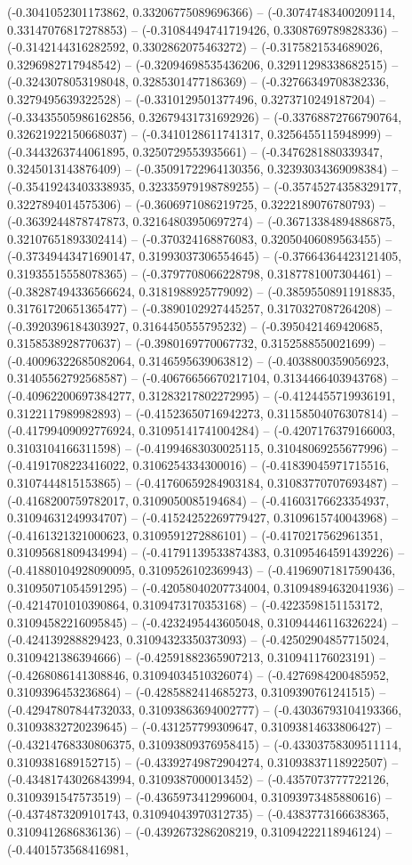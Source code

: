 (-0.3041052301173862, 0.33206775089696366) -- (-0.30747483400209114, 0.33147076817278853) -- (-0.31084494741719426, 0.3308769789828336) -- (-0.3142144316282592, 0.3302862075463272) -- (-0.3175821534689026, 0.3296982717948542) -- (-0.32094698535436206, 0.32911298338682515) -- (-0.3243078053198048, 0.3285301477186369) -- (-0.32766349708382336, 0.3279495639322528) -- (-0.3310129501377496, 0.3273710249187204) -- (-0.33435505986162856, 0.32679431731692926) -- (-0.33768872766790764, 0.32621922150668037) -- (-0.3410128611741317, 0.3256455115948999) -- (-0.3443263744061895, 0.3250729553935661) -- (-0.3476281880339347, 0.3245013143876409) -- (-0.35091722964130356, 0.32393034369098384) -- (-0.35419243403338935, 0.32335979198789255) -- (-0.35745274358329177, 0.3227894014575306) -- (-0.3606971086219725, 0.3222189076780793) -- (-0.3639244878747873, 0.32164803950697274) -- (-0.36713384894886875, 0.32107651893302414) -- (-0.370324168876083, 0.32050406089563455) -- (-0.37349443471690147, 0.31993037306554645) -- (-0.37664364423121405, 0.31935515558078365) -- (-0.3797708066228798, 0.3187781007304461) -- (-0.38287494336566624, 0.3181988925779092) -- (-0.38595508911918835, 0.31761720651365477) -- (-0.3890102927445257, 0.3170327087264208) -- (-0.3920396184303927, 0.3164450555795232) -- (-0.3950421469420685, 0.3158538928770637) -- (-0.3980169770067732, 0.3152588550021699) -- (-0.40096322685082064, 0.3146595639063812) -- (-0.4038800359056923, 0.31405562792568587) -- (-0.40676656670217104, 0.3134466403943768) -- (-0.40962200697384277, 0.31283217802272995) -- (-0.4124455719936191, 0.3122117989982893) -- (-0.41523650716942273, 0.31158504076307814) -- (-0.41799409092776924, 0.31095141741004284) -- (-0.4207176379166003, 0.3103104166311598) -- (-0.41994683030025115, 0.31048069255677996) -- (-0.4191708223416022, 0.3106254334300016) -- (-0.41839045971715516, 0.3107444815153865) -- (-0.41760659284903184, 0.31083770707693487) -- (-0.4168200759782017, 0.3109050085194684) -- (-0.41603176623354937, 0.31094631249934707) -- (-0.41524252269779427, 0.3109615740043968) -- (-0.4161321321000623, 0.3109591272886101) -- (-0.4170217562961351, 0.31095681809434994) -- (-0.41791139533874383, 0.31095464591439226) -- (-0.41880104928090095, 0.3109526102369943) -- (-0.41969071817590436, 0.31095071054591295) -- (-0.42058040207734004, 0.31094894632041936) -- (-0.4214701010390864, 0.3109473170353168) -- (-0.4223598151153172, 0.31094582216095845) -- (-0.4232495443605048, 0.31094446116326224) -- (-0.424139288829423, 0.31094323350373093) -- (-0.42502904857715024, 0.3109421386394666) -- (-0.42591882365907213, 0.310941176023191) -- (-0.4268086141308846, 0.31094034510326074) -- (-0.4276984200485952, 0.3109396453236864) -- (-0.4285882414685273, 0.3109390761241515) -- (-0.42947807844732033, 0.31093863694002777) -- (-0.43036793104193366, 0.31093832720239645) -- (-0.431257799309647, 0.31093814633806427) -- (-0.43214768330806375, 0.31093809376958415) -- (-0.43303758309511114, 0.3109381689152715) -- (-0.43392749872904274, 0.31093837118922507) -- (-0.43481743026843994, 0.3109387000013452) -- (-0.4357073777722126, 0.3109391547573519) -- (-0.4365973412996004, 0.31093973485880616) -- (-0.4374873209101743, 0.31094043970312735) -- (-0.4383773166638365, 0.3109412686836136) -- (-0.4392673286208219, 0.31094222118946124) -- (-0.4401573568416981, 